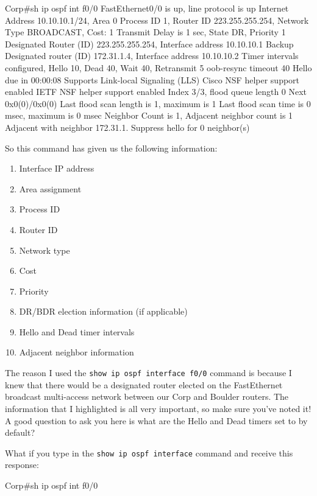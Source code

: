 \begin{cli}
Corp#sh ip ospf int f0/0
FastEthernet0/0 is up, line protocol is up
  Internet Address 10.10.10.1/24, Area 0
  Process ID 1, Router ID 223.255.255.254, Network Type BROADCAST, Cost: 1
  Transmit Delay is 1 sec, State DR, Priority 1
  Designated Router (ID) 223.255.255.254, Interface address 10.10.10.1
  Backup Designated router (ID) 172.31.1.4, Interface address 10.10.10.2
  Timer intervals configured, Hello 10, Dead 40, Wait 40, Retransmit 5
    oob-resync timeout 40
    Hello due in 00:00:08
  Supports Link-local Signaling (LLS)
  Cisco NSF helper support enabled
  IETF NSF helper support enabled
  Index 3/3, flood queue length 0
  Next 0x0(0)/0x0(0)
  Last flood scan length is 1, maximum is 1
  Last flood scan time is 0 msec, maximum is 0 msec
  Neighbor Count is 1, Adjacent neighbor count is 1
    Adjacent with neighbor 172.31.1.  Suppress hello for 0 neighbor(s)
\end{cli}

So this command has given us the following information:
\begin{enumerate}
\item
  Interface IP address
\item
  Area assignment
\item
  Process ID
\item
  Router ID
\item
  Network type
\item
  Cost
\item
  Priority
\item
  \protect\hypertarget{c18.xhtmlux5cux23Page_769}{}{}DR/BDR election
  information (if applicable)
\item
  Hello and Dead timer intervals
\item
  Adjacent neighbor information
\end{enumerate}

The reason I used the \texttt{show\ ip\ ospf\ interface\ f0/0} command
is because I knew that there would be a designated router elected on the
FastEthernet broadcast multi-access network between our Corp and Boulder
routers. The information that I highlighted is all very important, so
make sure you've noted it! A good question to ask you here is what are
the Hello and Dead timers set to by default?

What if you type in the \texttt{show\ ip\ ospf\ interface} command and
receive this response:

\begin{cli}
Corp#sh ip ospf int f0/0
\end{cli}

